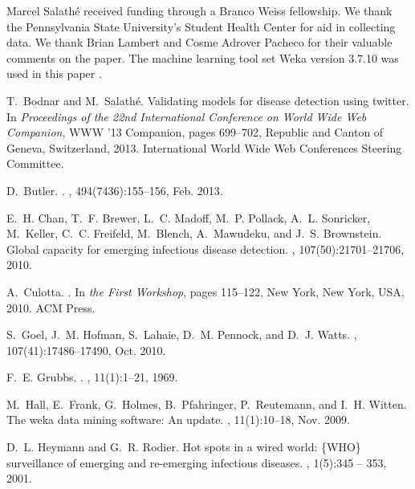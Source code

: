 \documentclass{acm_proc_article-sp}
\begin{document}
Marcel Salath\'e received funding through a Branco Weiss fellowship. We thank the Pennsylvania State University's Student Health Center for aid in collecting data. We thank Brian Lambert and Cosme Adrover Pacheco for their valuable comments on the paper. The machine learning tool set Weka version 3.7.10 was used in this paper \cite{Hall:2009ud}.
\begin{thebibliography}{10}

T.~Bodnar and M.~Salath{\'e}.
\newblock Validating models for disease detection using twitter.
\newblock In {\em Proceedings of the 22nd International Conference on World
  Wide Web Companion}, WWW '13 Companion, pages 699--702, Republic and Canton
  of Geneva, Switzerland, 2013. International World Wide Web Conferences
  Steering Committee.

D.~Butler.
.
, 494(7436):155--156, Feb. 2013.

E.~H. Chan, T.~F. Brewer, L.~C. Madoff, M.~P. Pollack, A.~L. Sonricker,
  M.~Keller, C.~C. Freifeld, M.~Blench, A.~Mawudeku, and J.~S. Brownstein.
\newblock Global capacity for emerging infectious disease detection.
,
  107(50):21701--21706, 2010.

A.~Culotta.
.
\newblock In {\em the First Workshop}, pages 115--122, New York, New York, USA,
  2010. ACM Press.

S.~Goel, J.~M. Hofman, S.~Lahaie, D.~M. Pennock, and D.~J. Watts.
, 107(41):17486--17490, Oct. 2010.

F.~E. Grubbs.
.
, 11(1):1--21, 1969.

M.~Hall, E.~Frank, G.~Holmes, B.~Pfahringer, P.~Reutemann, and I.~H. Witten.
\newblock The weka data mining software: An update.
, 11(1):10--18, Nov. 2009.

D.~L. Heymann and G.~R. Rodier.
\newblock Hot spots in a wired world: \{WHO\} surveillance of emerging and
  re-emerging infectious diseases.
, 1(5):345 -- 353, 2001.


\end{thebibliography}
\end{document}
